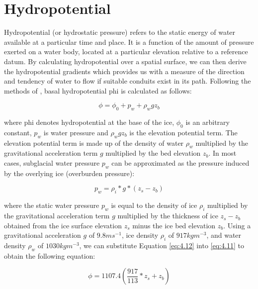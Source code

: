 \chapter{Hydropotential} \label{sec:hydropotential}


Hydropotential (or hydrostatic pressure) refers to the static energy of water available at a particular time and place.
It is a function of the amount of pressure exerted on a water body, located at a particular elevation relative to a reference datum.
By calculating hydropotential over a spatial surface, we can then derive the hydropotential gradients which provides us with a measure of the direction and tendency of water to flow if suitable conduits exist in its path.
Following the methods of \citet{ShreveMovementWaterGlaciers1972}, basal hydropotential \gls{phi} is calculated as follows:

\begin{equation}\label{eq:4.11}
  \phi = \phi_0 + p_w + \rho_wgz_b
\end{equation}

where \gls{phi} denotes hydropotential at the base of the ice, $\phi_0$ is an arbitrary constant, $p_w$ is water pressure and $\rho_wgz_b$ is the elevation potential term.
The elevation potential term is made up of the density of water $\rho_w$ multiplied by the gravitational acceleration term $g$ multiplied by the bed elevation $z_b$.
In most cases, subglacial water pressure $p_w$ can be approximated as the pressure induced by the overlying ice (overburden pressure):

\begin{equation}\label{eq:4.12}
  p_w = \rho_i * g * (z_s - z_b)
\end{equation}

where the static water pressure $p_w$ is equal to the density of ice $\rho_i$ multiplied by the gravitational acceleration term $g$ multiplied by the thickness of ice $z_s - z_b$ obtained from the ice surface elevation $z_s$ minus the ice bed elevation $z_b$.
Using a gravitational acceleration $g$ of $9.8ms^{-1}$, ice density $\rho_i$ of $917kgm^{-3}$, and water density $\rho_w$ of $1030kgm^{-3}$, we can substitute Equation \eqref{eq:4.12} into \eqref{eq:4.11} to obtain the following equation:

\begin{equation}\label{eq:4.13}
  \phi = 1107.4\left(\frac{917}{113} * z_s + z_b \right)
\end{equation}

